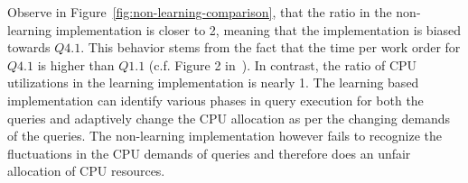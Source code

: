 Observe in Figure~\ref{fig:non-learning-comparison}, that the ratio in the non-learning implementation is closer to 2, meaning that the 
implementation is biased towards $Q4.1$. 
This behavior stems from the fact that the time per work order for $Q4.1$ is higher than $Q1.1$ (c.f. Figure 2 in~\cite{supplement}).
In contrast, the ratio of CPU utilizations in the learning implementation is nearly 1.
The learning based implementation can identify various phases in query execution for 
both the queries and adaptively change the CPU allocation as per the changing demands 
of the queries.
The non-learning implementation however fails to recognize the fluctuations in the CPU 
demands of queries and therefore does an unfair allocation of CPU resources.
%
